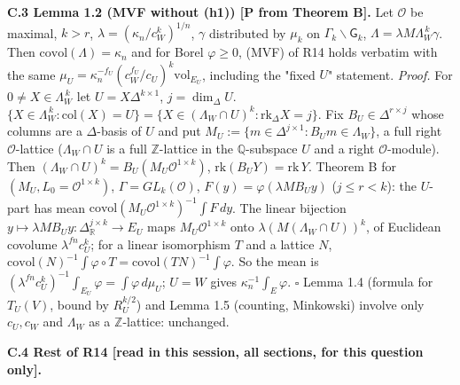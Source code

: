 \textbf{C.3 Lemma 1.2\textquotesingle{} (MVF without (h1)) {[}P from Theorem B{]}.} Let \(\mathcal O\) be maximal, \(k>r\), \(\lambda=(\kappa_n/c_W^k)^{1/n}\), \(\gamma\) distributed by \(\mu_k\) on \(\Gamma_k\backslash\mathsf G_k\), \(\Lambda=\lambda M\Lambda_W^{\,k}\gamma\). Then \(\mathrm{covol}(\Lambda)=\kappa_n\) and for Borel \(\varphi\ge0\), (MVF) of R14 holds verbatim with the same \(\mu_U=\kappa_n^{-f_U}(c_W^{f_U}/c_U)^k\mathrm{vol}_{E_U}\), including the "fixed \(U\)" statement.
\emph{Proof.} For \(0\ne X\in\Lambda_W^{\,k}\) let \(U=X\Delta^{k\times1}\), \(j=\dim_\Delta U\). \(\{X\in\Lambda_W^{\,k}:\mathrm{col}(X)=U\}=\{X\in(\Lambda_W\cap U)^k:\mathrm{rk}_\Delta X=j\}\). Fix \(B_U\in\Delta^{r\times j}\) whose columns are a \(\Delta\)-basis of \(U\) and put \(M_U:=\{m\in\Delta^{j\times1}:B_Um\in\Lambda_W\}\), a full right \(\mathcal O\)-lattice (\(\Lambda_W\cap U\) is a full \(\mathbb Z\)-lattice in the \(\mathbb Q\)-subspace \(U\) and a right \(\mathcal O\)-module). Then \((\Lambda_W\cap U)^k=B_U(M_U\mathcal O^{1\times k})\), \(\mathrm{rk}(B_UY)=\mathrm{rk}\,Y\). Theorem B for \((M_U,L_0=\mathcal O^{1\times k})\), \(\Gamma=GL_k(\mathcal O)\), \(F(y)=\varphi(\lambda MB_Uy)\) (\(j\le r<k\)): the \(U\)-part has mean \(\mathrm{covol}(M_U\mathcal O^{1\times k})^{-1}\int F\,dy\). The linear bijection \(y\mapsto\lambda MB_Uy:\Delta_{\mathbb R}^{j\times k}\to E_U\) maps \(M_U\mathcal O^{1\times k}\) onto \(\lambda(M(\Lambda_W\cap U))^k\), of Euclidean covolume \(\lambda^{fn}c_U^k\); for a linear isomorphism \(T\) and a lattice \(N\), \(\mathrm{covol}(N)^{-1}\int\varphi\circ T=\mathrm{covol}(TN)^{-1}\int\varphi\). So the mean is \((\lambda^{fn}c_U^k)^{-1}\int_{E_U}\varphi=\int\varphi\,d\mu_U\); \(U=W\) gives \(\kappa_n^{-1}\int_E\varphi\). \(\square\)
Lemma 1.4 (formula for \(T_U(V)\), bound by \(R_U^{k/2}\)) and Lemma 1.5 (counting, Minkowski) involve only \(c_U,c_W\) and \(\Lambda_W\) as a \(\mathbb Z\)-lattice: unchanged.

\textbf{C.4 Rest of R14 {[}read in this session, all sections, for this question only{]}.}

